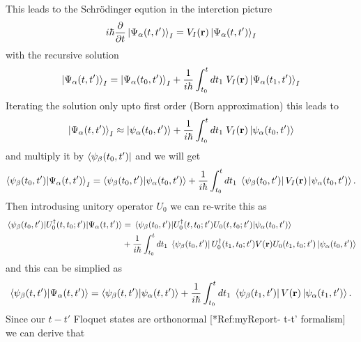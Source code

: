 This leads to the Schrödinger  eqution in the interction picture
\begin{equation} \label{4.9}
  i \hbar \pdv{t}\ket{\Psi_{\alpha}(t,t')}_I =
  V_I(\mathbf{r})\ket{\Psi_{\alpha}(t,t')}_I
\end{equation}
with the recursive solution
\begin{equation} \label{4.10}
  \ket{\Psi_{\alpha}(t,t')}_I = \ket{\Psi_{\alpha}(t_0,t')}_I +
  \frac{1}{i\hbar}
  \int_{t_0}^t dt_1 \;
  V_I(\mathbf{r}) \ket{\Psi_{\alpha}(t_1,t')}_I
\end{equation}
Iterating the solution only upto first order (Born approximation) this leads to
\begin{equation} \label{4.11}
  \ket{\Psi_{\alpha}(t,t')}_I \approx \ket{\psi_{\alpha}(t_0,t')} +
  \frac{1}{i\hbar}
  \int_{t_0}^t dt_1 \;
  V_I(\mathbf{r}) \ket{\psi_{\alpha}(t_0,t')}
\end{equation}
and multiply it by $\bra{\psi_{\beta}(t_0,t')}$ and we will get
\begin{equation} \label{4.12}
  \braket{\psi_{\beta}(t_0,t')}{\Psi_{\alpha}(t,t')}_I = \braket{\psi_{\beta}(t_0,t')}{\psi_{\alpha}(t_0,t')} +
  \frac{1}{i\hbar}
  \int_{t_0}^t dt_1 \;
  \bra{\psi_{\beta}(t_0,t')}
  V_I(\mathbf{r}) \ket{\psi_{\alpha}(t_0,t')}.
\end{equation}
Then introdusing unitory operator $U_0$ we can re-write this as
\begin{equation} \label{4.13}
  \begin{aligned}
    \mel{\psi_{\beta}(t_0,t')}{U_0^{\dagger}(t,t_0;t')}{\Psi_{\alpha}(t,t')} & = \mel{\psi_{\beta}(t_0,t')}{U_0^{\dagger}(t,t_0;t')U_0(t,t_0;t')}{\psi_{\alpha}(t_0,t')} \\
    & +
    \frac{1}{i\hbar}
    \int_{t_0}^t dt_1 \;
    \bra{\psi_{\beta}(t_0,t')}
    U_0^{\dagger}(t_1,t_0;t')
    V(\mathbf{r})
    U_0(t_1,t_0;t')
    \ket{\psi_{\alpha}(t_0,t')}
  \end{aligned}
\end{equation}
and this can be simplied as
\begin{equation} \label{4.14}
  \begin{aligned}
    \braket{\psi_{\beta}(t,t')}{\Psi_{\alpha}(t,t')} = \braket{\psi_{\beta}(t,t')}{\psi_{\alpha}(t,t')} +
    \frac{1}{i\hbar}
    \int_{t_0}^t dt_1 \;
    \bra{\psi_{\beta}(t_1,t')}
    V(\mathbf{r}) \ket{\psi_{\alpha}(t_1,t')}.
  \end{aligned}
\end{equation}
Since our $t-t'$ Floquet states are orthonormal [*Ref:myReport- t-t' formalism] we can derive that
